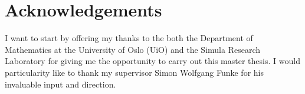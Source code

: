 \chapter*{Acknowledgements}
I want to start by offering my thanks to the both the Department of Mathematics at the University of Oslo (UiO) and the Simula Research Laboratory for giving me the opportunity to carry out this master thesis. 
I would particularity like to thank my supervisor Simon Wolfgang Funke for his invaluable input and direction. 
